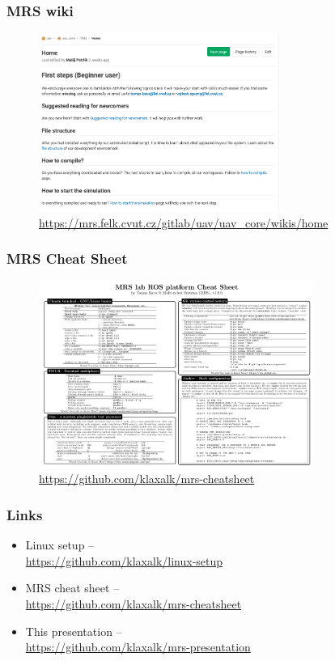 \documentclass[aspectratio=1610]{beamer}
\begin{document}
\begin{frame}
  \frametitle{MRS wiki}
  \begin{figure}
    \vspace{-1em}
    \caption*{\url{https://mrs.felk.cvut.cz/gitlab/uav/uav_core/wikis/home}}
    \includegraphics[width=0.7\textwidth]{./fig/wiki.png}
  \end{figure}

\end{frame}

\begin{frame}
  \frametitle{MRS Cheat Sheet}
  \vspace{-1em}
  \begin{figure}
    \caption*{\url{https://github.com/klaxalk/mrs-cheatsheet}}
    \includegraphics[width=0.8\textwidth]{./fig/mrs_cheatsheet.png}
  \end{figure}

\end{frame}

\begin{frame}
  \frametitle{Links}

  \begin{itemize}
    \item Linux setup -- \\\url{https://github.com/klaxalk/linux-setup}
    \item MRS cheat sheet -- \\\url{https://github.com/klaxalk/mrs-cheatsheet}
    \item This presentation -- \\\url{https://github.com/klaxalk/mrs-presentation}
  \end{itemize}

\end{frame}
\end{document}
